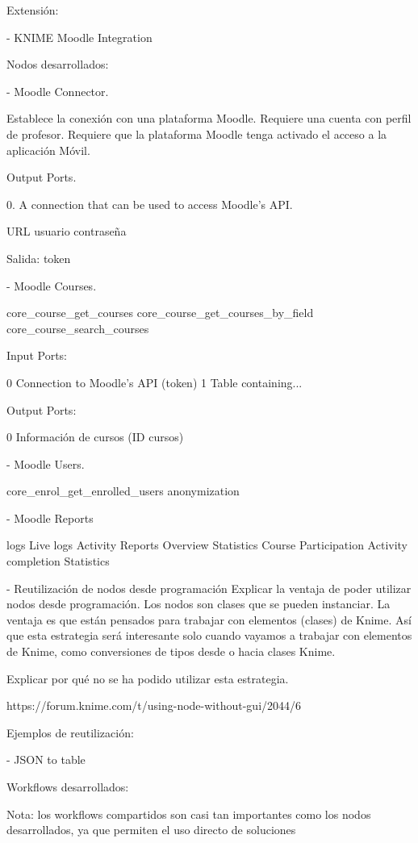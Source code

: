 Extensión: 

- KNIME Moodle Integration


Nodos desarrollados:

- Moodle Connector. 

Establece la conexión con una plataforma Moodle. Requiere una cuenta con perfil de profesor. 
Requiere que la plataforma Moodle tenga activado el acceso a la aplicación Móvil. 

Output Ports. 

0. A connection that can be used to access Moodle's API.

URL
usuario
contraseña


Salida: token

- Moodle Courses. 

core\_course\_get\_courses
core\_course\_get\_courses\_by\_field
core\_course\_search\_courses

Input Ports: 

0 Connection to Moodle's API (token)
1 Table containing... 

Output Ports: 

0 Información de cursos (ID cursos)



- Moodle Users. 

core\_enrol\_get\_enrolled\_users
anonymization


- Moodle Reports

logs
Live logs
Activity Reports
Overview Statistics
Course Participation
Activity completion
Statistics


- Reutilización de nodos desde programación 
Explicar la ventaja de poder utilizar nodos desde programación. Los nodos son clases que se pueden instanciar. 
La ventaja es que están pensados para trabajar con elementos (clases) de Knime. Así que esta estrategia será interesante solo cuando vayamos a trabajar con elementos de Knime,
como conversiones de tipos desde o hacia clases Knime. 

Explicar por qué no se ha podido utilizar esta estrategia.

https://forum.knime.com/t/using-node-without-gui/2044/6


Ejemplos de reutilización: 
 
 - JSON to table


Workflows desarrollados: 

Nota: los workflows compartidos son casi tan importantes como los nodos desarrollados, ya que permiten el uso directo de soluciones 

